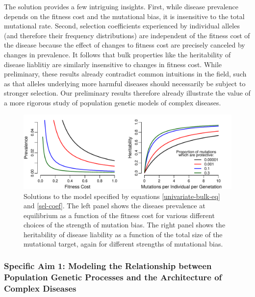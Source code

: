 \message{ !name(ResearchStrategy.tex)}\documentclass[11pt]{article}
\begin{document}
The solution provides a few intriguing insights. First, while disease prevalence depends on the fitness cost and the mutational bias, it is insensitive to the total mutational rate. Second, selection coefficients experienced by individual alleles (and therefore their frequency distributions) are independent of the fitness cost of the disease because the effect of changes to fitness cost are precisely canceled by changes in prevalence. It follows that bulk properties like the heritability of disease liablitiy are similarly insensitive to changes in fitness cost. While preliminary, these results already contradict common intuitions in the field, such as that alleles underlying more harmful diseases should necessarily be subject to stronger selection. Our preliminary results therefore already illustrate the value of a more rigorous study of population genetic models of complex diseases.


  \begin{figure}
    \includegraphics[width=\textwidth]{../figures/SimpleModelSolutions.pdf}
    \caption{Solutions to the model specified by equations \eqref{univariate-bulk-eq} and \eqref{sel-coef}. The left panel shows the diseaes prevalence at equilibrium as a function of the fitness cost for various different choices of the strength of mutation bias. The right panel shows the heritability of disease liability as a function of the total size of the mutational target, again for different strengths of mutational bias.}
    \label{simple-model-solve}
  \end{figure}
  



\subsubsection*{Specific Aim 1: Modeling the Relationship between Population Genetic Processes and the Architecture of Complex Diseases}
\end{document}
